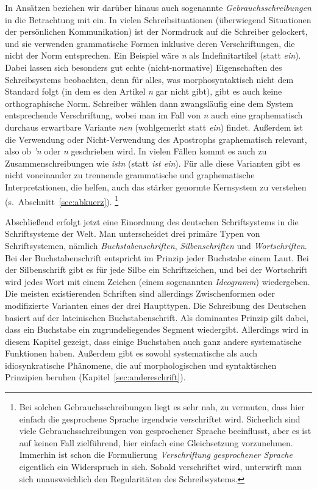 In Ansätzen beziehen wir darüber hinaus auch sogenannte \textit{Gebrauchsschreibungen} in die Betrachtung mit ein.
In vielen Schreibsituationen (überwiegend Situationen der persönlichen Kommunikation) ist der Normdruck auf die Schreiber gelockert, und sie verwenden grammatische Formen inklusive deren Verschriftungen, die nicht der Norm entsprechen.
Ein Beispiel wäre \textit{n} als Indefinitartikel (statt \textit{ein}).
Dabei lassen sich besonders gut echte (nicht-normative) Eigenschaften des Schreibsystems beobachten, denn für alles, was morphosyntaktisch nicht dem Standard folgt (in dem es den Artikel \textit{n} gar nicht gibt), gibt es auch keine orthographische Norm.
Schreiber wählen dann zwangsläufig eine dem System entsprechende Verschriftung, wobei man im Fall von \textit{n} auch eine graphematisch durchaus erwartbare Variante \textit{nen} (wohlgemerkt statt \textit{ein}) findet.
Außerdem ist die Verwendung oder Nicht-Verwendung des Apostrophs graphematisch relevant, also ob \textit{'n} oder \textit{n} geschrieben wird.
In vielen Fällen kommt es auch zu Zusammenschreibungen wie \textit{istn} (statt \textit{ist ein}).
Für alle diese Varianten gibt es nicht voneinander zu trennende grammatische und graphematische Interpretationen, die helfen, auch das stärker genormte Kernsystem zu verstehen (s.\ Abschnitt~\ref{sec:abkuerz}).%
\footnote{Bei solchen Gebrauchsschreibungen liegt es sehr nah, zu vermuten, dass hier einfach die gesprochene Sprache irgendwie verschriftet wird.
Sicherlich sind viele Gebrauchsschreibungen von gesprochener Sprache beeinflusst, aber es ist auf keinen Fall zielführend, hier einfach eine Gleichsetzung vorzunehmen.
Immerhin ist schon die Formulierung \textit{Verschriftung gesprochener Sprache} eigentlich ein Widerspruch in sich.
Sobald verschriftet wird, unterwirft man sich unausweichlich den Regularitäten des Schreibsystems.}

Abschließend erfolgt jetzt eine Einordnung des deutschen Schriftsystems in die Schriftsysteme der Welt.
Man unterscheidet drei primäre Typen von Schriftsystemen, nämlich \textit{Buchstabenschriften}, \textit{Silbenschriften} und \textit{Wortschriften}.
Bei der Buchstabenschrift entspricht im Prinzip jeder Buchstabe einem Laut.
Bei der Silbenschrift gibt es für jede Silbe ein Schriftzeichen, und bei der Wortschrift wird jedes Wort mit einem Zeichen (einem sogenannten \textit{Ideogramm}) wiedergeben.
Die meisten existierenden Schriften sind allerdings Zwischenformen oder modifizierte Varianten eines der drei Haupttypen.
Die Schreibung des Deutschen basiert auf der lateinischen Buchstabenschrift.
Als dominantes Prinzip gilt dabei, dass ein Buchstabe ein zugrundeliegendes Segment wiedergibt.
Allerdings wird in diesem Kapitel gezeigt, dass einige Buchstaben auch ganz andere systematische Funktionen haben.
Außerdem gibt es sowohl systematische als auch idiosynkratische Phänomene, die auf morphologischen und syntaktischen Prinzipien beruhen (Kapitel~\ref{sec:andereschrift}).

